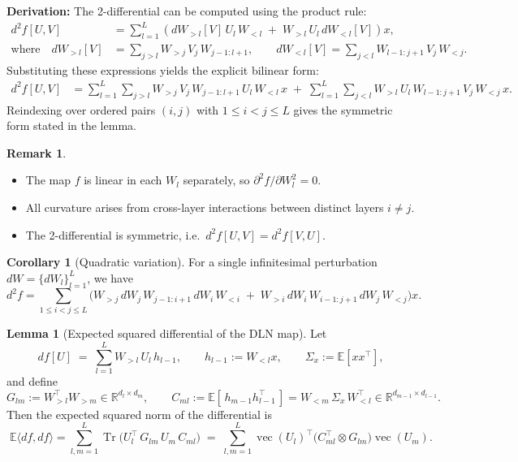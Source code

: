 \documentclass{article}
\theoremstyle{definition}
\newtheorem{lemma}[theorem]{Lemma}
\newtheorem{corollary}[theorem]{Corollary}
\newtheorem{remark}[theorem]{Remark}
\begin{document}
\textbf{Derivation:}
The 2-differential can be computed using the product rule:
\begin{align*}
    d^2 f[U, V]
    &= \sum_{l=1}^L \left( dW_{>l}[V]\, U_l\, W_{<l}
    \;+\; W_{>l}\, U_l\, dW_{<l}[V] \right)x, \\
    \text{where}\quad
    dW_{>l}[V] &= \sum_{j>l} W_{>j}\, V_j\, W_{j-1:l+1}, \qquad
    dW_{<l}[V] = \sum_{j<l} W_{l-1:j+1}\, V_j\, W_{<j}.
\end{align*}
Substituting these expressions yields the explicit bilinear form:
\begin{align*}
    d^2 f[U, V]
    &= \sum_{l=1}^L \sum_{j>l}
        W_{>j}\, V_j\, W_{j-1:l+1}\, U_l\, W_{<l}\, x
     \;+\;
       \sum_{l=1}^L \sum_{j<l}
        W_{>l}\, U_l\, W_{l-1:j+1}\, V_j\, W_{<j}\, x.
\end{align*}
Reindexing over ordered pairs $(i,j)$ with $1 \le i < j \le L$ gives the symmetric form stated in the lemma.
\begin{remark}\label{rem:second-differential}
\begin{itemize}
    \item The map $f$ is linear in each $W_l$ separately, so $\partial^2 f / \partial W_l^2 = 0$.
    \item All curvature arises from cross-layer interactions between distinct layers $i \ne j$.
    \item The 2-differential is symmetric, i.e.\ $d^2 f[U, V] = d^2 f[V, U]$.
\end{itemize}
\end{remark}
\begin{corollary}[Quadratic variation]\label{cor:quadratic-variation}
For a single infinitesimal perturbation $dW = \{dW_l\}_{l=1}^L$, we have
\begin{equation*}
    \boxed{
    d^2 f
    = \sum_{1 \le i < j \le L}
    \Big(
        W_{>j}\, dW_j\, W_{j-1:i+1}\, dW_i\, W_{<i}
        \;+\;
        W_{>i}\, dW_i\, W_{i-1:j+1}\, dW_j\, W_{<j}
    \Big)x. }
\end{equation*}
\end{corollary}
\begin{lemma}[Expected squared differential of the DLN map]
Let
\[
df[U] \;=\; \sum_{l=1}^L W_{>l}\,U_l\,h_{l-1}, 
\qquad h_{l-1}:=W_{<l}x,\qquad 
\Sigma_x:=\mathbb{E}[xx^\top],
\]
and define
\[
G_{lm}:=W_{>l}^\top W_{>m}\in\mathbb{R}^{d_l\times d_m},
\qquad
C_{ml}:=\mathbb{E}[\,h_{m-1}h_{l-1}^\top\,]
= W_{<m}\,\Sigma_x\,W_{<l}^\top \in\mathbb{R}^{d_{m-1}\times d_{l-1}}.
\]
Then the expected squared norm of the differential is
\[
\boxed{\;
\mathbb{E}\langle df,df\rangle
= \sum_{l,m=1}^L \operatorname{Tr}\!\big(U_l^\top\,G_{lm}\,U_m\,C_{ml}\big)
\;=\;
\sum_{l,m=1}^L \operatorname{vec}(U_l)^\top
\big(C_{ml}^\top\!\otimes G_{lm}\big)\operatorname{vec}(U_m).
\;}
\]
\end{lemma}
\end{document}
